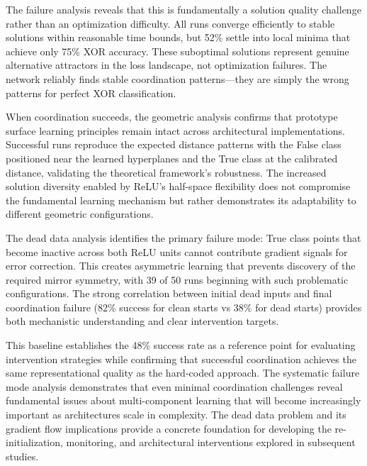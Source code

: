 The failure analysis reveals that this is fundamentally a solution quality challenge rather than an optimization difficulty. All runs converge efficiently to stable solutions within reasonable time bounds, but 52\% settle into local minima that achieve only 75\% XOR accuracy. These suboptimal solutions represent genuine alternative attractors in the loss landscape, not optimization failures. The network reliably finds stable coordination patterns—they are simply the wrong patterns for perfect XOR classification.

When coordination succeeds, the geometric analysis confirms that prototype surface learning principles remain intact across architectural implementations. Successful runs reproduce the expected distance patterns with the False class positioned near the learned hyperplanes and the True class at the calibrated distance, validating the theoretical framework's robustness. The increased solution diversity enabled by ReLU's half-space flexibility does not compromise the fundamental learning mechanism but rather demonstrates its adaptability to different geometric configurations.

The dead data analysis identifies the primary failure mode: True class points that become inactive across both ReLU units cannot contribute gradient signals for error correction. This creates asymmetric learning that prevents discovery of the required mirror symmetry, with 39 of 50 runs beginning with such problematic configurations. The strong correlation between initial dead inputs and final coordination failure (82\% success for clean starts vs 38\% for dead starts) provides both mechanistic understanding and clear intervention targets.

This baseline establishes the 48\% success rate as a reference point for evaluating intervention strategies while confirming that successful coordination achieves the same representational quality as the hard-coded approach. The systematic failure mode analysis demonstrates that even minimal coordination challenges reveal fundamental issues about multi-component learning that will become increasingly important as architectures scale in complexity. The dead data problem and its gradient flow implications provide a concrete foundation for developing the re-initialization, monitoring, and architectural interventions explored in subsequent studies.